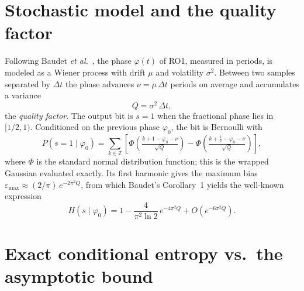\section{Stochastic model and the quality factor}
\label{sec:model}

Following Baudet \emph{et al.}~\cite{baudet_2011_security}, the phase
$\varphi(t)$ of RO1, measured in periods, is modeled as a Wiener process
with drift $\mu$ and volatility $\sigma^2$. Between two samples separated
by $\Delta t$ the phase advances $\nu = \mu\,\Delta t$ periods on average
and accumulates a variance
\begin{equation}
  Q = \sigma^2\,\Delta t ,
  \label{eq:Q}
\end{equation}
the \emph{quality factor}. The output bit is $s = 1$ when the fractional
phase lies in $[1/2, 1)$. Conditioned on the previous phase $\varphi_0$,
the bit is Bernoulli with
\begin{equation}
  P(s=1 \mid \varphi_0) = \sum_{k\in\mathbb{Z}}
  \left[\Phi\!\left(\tfrac{k+1-\varphi_0-\nu}{\sqrt{Q}}\right) -
        \Phi\!\left(\tfrac{k+\tfrac12-\varphi_0-\nu}{\sqrt{Q}}\right)\right],
  \label{eq:puno}
\end{equation}
where $\Phi$ is the standard normal distribution function; this is the
wrapped Gaussian evaluated exactly. Its first harmonic gives the maximum
bias $\varepsilon_{\max} \approx (2/\pi)\,e^{-2\pi^2 Q}$, from which
Baudet's Corollary~1 yields the well-known expression
\begin{equation}
  H(s \mid \varphi_0) = 1 - \frac{4}{\pi^2 \ln 2}\, e^{-4\pi^2 Q}
  + O\!\left(e^{-6\pi^2 Q}\right).
  \label{eq:baudet14}
\end{equation}

\section{Exact conditional entropy vs.\ the asymptotic bound}
\label{sec:exact}

